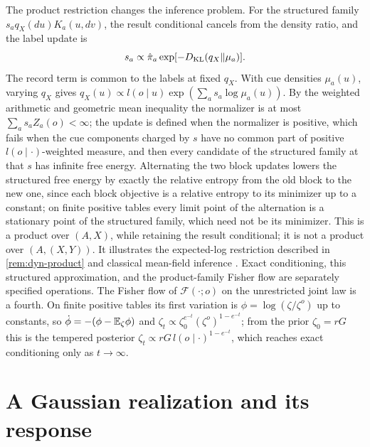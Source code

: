The product restriction changes the inference problem. For the structured family $s_aq_X(du)K_a(u,dv)$, the result conditional cancels from the density ratio, and the label update is
\begin{equation}
 s_a\propto\hat\pi_a\exp[-D_{\mathrm{KL}}(q_X\Vert\mu_a)].
 \label{cmem:product-label}
\end{equation}
The record term is common to the labels at fixed $q_X$. With cue densities $\mu_a(u)$, varying $q_X$ gives $q_X(u)\propto l(o\mid u)\exp(\sum_a s_a\log\mu_a(u))$. By the weighted arithmetic and geometric mean inequality the normalizer is at most $\sum_as_aZ_a(o)<\infty$; the update is defined when the normalizer is positive, which fails when the cue components charged by $s$ have no common part of positive $l(o\mid\cdot)$-weighted measure, and then every candidate of the structured family at that $s$ has infinite free energy. Alternating the two block updates lowers the structured free energy by exactly the relative entropy from the old block to the new one, since each block objective is a relative entropy to its minimizer up to a constant; on finite positive tables every limit point of the alternation is a stationary point of the structured family, which need not be its minimizer. This is a product over $(A,X)$, while retaining the result conditional; it is not a product over $(A,(X,Y))$. It illustrates the expected-log restriction described in \cref{rem:dyn-product} and classical mean-field inference \citep{BleiEtAl2017}. Exact conditioning, this structured approximation, and the product-family Fisher flow are separately specified operations. The Fisher flow of $\mathcal F(\cdot;o)$ on the unrestricted joint law is a fourth. On finite positive tables its first variation is $\phi=\log(\zeta/\zeta^o)$ up to constants, so $\dot\phi=-(\phi-\mathbb E_\zeta\phi)$ and $\zeta_t\propto\zeta_0^{e^{-t}}(\zeta^o)^{1-e^{-t}}$; from the prior $\zeta_0=rG$ this is the tempered posterior $\zeta_t\propto rG\,l(o\mid\cdot)^{1-e^{-t}}$, which reaches exact conditioning only as $t\to\infty$.

\section{A Gaussian realization and its response}

